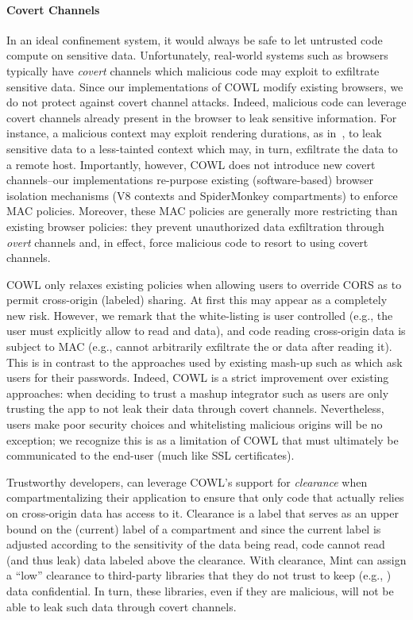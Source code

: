 \paragraph{Covert Channels}
In an ideal confinement system, it would always be safe to let untrusted
code compute on sensitive data.
%
Unfortunately, real-world systems such as browsers typically have
\emph{covert} channels which malicious code may exploit to exfiltrate
sensitive data.
%
Since our implementations of COWL modify existing browsers, we do not
protect against covert channel attacks.
%
Indeed, malicious code can leverage covert channels already present in
the browser to leak sensitive information.
%
For instance, a malicious context may exploit rendering durations, as
in~\cite{kotcher2013cross}, to leak sensitive data to a less-tainted
context which may, in turn, exfiltrate the data to a remote host.
%
Importantly, however, COWL does not introduce new covert channels--our
implementations re-purpose existing (software-based) browser isolation
mechanisms (V8 contexts and SpiderMonkey compartments) to enforce MAC
policies.
%
Moreover, these MAC policies are generally more restricting than
existing browser policies: they prevent unauthorized data exfiltration
through \emph{overt} channels and, in effect, force malicious code to
resort to using covert channels.


COWL only relaxes existing policies when allowing users to override
CORS as to permit cross-origin (labeled) sharing.
%
At first this may appear as a completely new risk.
%
However, we remark that the white-listing is user controlled (e.g.,
the user must explicitly allow  to read
 and  data), and code reading
cross-origin data is subject to MAC (e.g.,  cannot
arbitrarily exfiltrate the  or 
data after reading it).
%
This is in contrast to the approaches used by existing mash-up such as
 which ask users for their passwords.
%
Indeed, COWL is a strict improvement over existing approaches: when
deciding to trust a mashup integrator such as  users
are only trusting the app to not leak their data through covert
channels.
%
Nevertheless, users make poor security choices and whitelisting
malicious origins will be no exception; we recognize this is as a
limitation of COWL that must ultimately be communicated to the end-user
(much like SSL certificates).

Trustworthy developers, can leverage COWL's support for
\emph{clearance} when compartmentalizing their application to ensure
that only code that actually relies on cross-origin data has access to
it.
%
Clearance is a label that serves as an upper bound on the (current)
label of a compartment and since the current label is adjusted
according to the sensitivity of the data being read, code cannot read
(and thus leak) data labeled above the clearance.
%
With clearance, Mint can assign a ``low'' clearance to
third-party libraries that they do not trust to keep (e.g.,
) data confidential.
%
In turn, these libraries, even if they are malicious, will not be able
to leak such data through covert channels.

